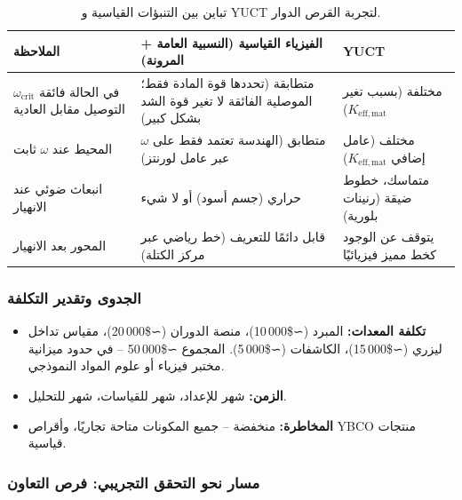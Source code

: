 \documentclass[12pt,a4paper]{article}
\begin{document}
	\begin{table}[h]
		\centering
		\caption{تباين بين التنبؤات القياسية و YUCT لتجربة القرص الدوار.}
		\label{tab:experiment_predictions}
		\begin{tabular}{p{5cm}p{4cm}p{4cm}}
			\toprule
			\textbf{الملاحظة} & \textbf{الفيزياء القياسية (النسبية العامة + المرونة)} & \textbf{YUCT} \\
			\midrule
			\(\omega_{\text{crit}}\) في الحالة فائقة التوصيل مقابل العادية & متطابقة (تحددها قوة المادة فقط؛ الموصلية الفائقة لا تغير قوة الشد بشكل كبير) & مختلفة (بسبب تغير \(K_{\mathrm{eff,mat}}\)) \\
			المحيط عند \(\omega\) ثابت & متطابق (الهندسة تعتمد فقط على \(\omega\) عبر عامل لورنتز) & مختلف (عامل إضافي \(K_{\mathrm{eff,mat}}\)) \\
			انبعاث ضوئي عند الانهيار & حراري (جسم أسود) أو لا شيء & متماسك، خطوط ضيقة (رنينات بلورية) \\
			المحور بعد الانهيار & قابل دائمًا للتعريف (خط رياضي عبر مركز الكتلة) & يتوقف عن الوجود كخط مميز فيزيائيًا \\
			\bottomrule
		\end{tabular}
	\end{table}
	
	\subsubsection{الجدوى وتقدير التكلفة}
	
	\begin{itemize}
		\item \textbf{تكلفة المعدات:} المبرد (∼\$10 000)، منصة الدوران (∼\$20 000)، مقياس تداخل ليزري (∼\$15 000)، الكاشفات (∼\$5 000). المجموع ∼\$50 000 – في حدود ميزانية مختبر فيزياء أو علوم المواد النموذجي.
		\item \textbf{الزمن:} شهر للإعداد، شهر للقياسات، شهر للتحليل.
		\item \textbf{المخاطرة:} منخفضة – جميع المكونات متاحة تجاريًا، وأقراص YBCO منتجات قياسية.
	\end{itemize}
	
	\subsubsection{مسار نحو التحقق التجريبي: فرص التعاون}
	
\end{document}
